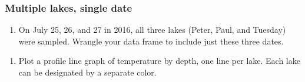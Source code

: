 \documentclass[]{article}
\newenvironment{Shaded}{\begin{snugshade}}{\end{snugshade}}
\newcommand{\DecValTok}[1]{\textcolor[rgb]{0.00,0.00,0.81}{#1}}
\newcommand{\KeywordTok}[1]{\textcolor[rgb]{0.13,0.29,0.53}{\textbf{#1}}}
\newcommand{\NormalTok}[1]{#1}
\newcommand{\OperatorTok}[1]{\textcolor[rgb]{0.81,0.36,0.00}{\textbf{#1}}}
\newcommand{\StringTok}[1]{\textcolor[rgb]{0.31,0.60,0.02}{#1}}
\providecommand{\tightlist}{%
  \setlength{\itemsep}{0pt}\setlength{\parskip}{0pt}}
\begin{document}
\hypertarget{multiple-lakes-single-date}{%
\subsubsection{Multiple lakes, single
date}\label{multiple-lakes-single-date}}

\begin{enumerate}
\def\labelenumi{\arabic{enumi}.}
\setcounter{enumi}{7}
\tightlist
\item
  On July 25, 26, and 27 in 2016, all three lakes (Peter, Paul, and
  Tuesday) were sampled. Wrangle your data frame to include just these
  three dates.
\end{enumerate}

\begin{Shaded}
\end{Shaded}

\begin{enumerate}
\def\labelenumi{\arabic{enumi}.}
\setcounter{enumi}{8}
\tightlist
\item
  Plot a profile line graph of temperature by depth, one line per lake.
  Each lake can be designated by a separate color.
\end{enumerate}
\end{document}

